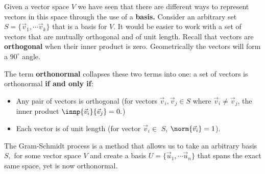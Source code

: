 \pgfplotsset{width=7cm,compat=1.16}


Given a vector space $V$ we have seen that there are different ways to represent vectors in this space through the use of a \textbf{basis.} Consider an arbitrary set $S = \{ \vec{v}_{1}, \cdots \vec{v}_{k} \}$ that is a basis for $V.$ It would be easier to work with a set of vectors that are mutually orthogonal and of unit length. Recall that vectors are \textbf{orthogonal} when their inner product is zero. Geometrically the vectors will form a $90^{\circ}$ angle.

The term \textbf{orthonormal} collapses these two terms into one: a set of vectors is orthonormal \textbf{if and only if}:
  \begin{itemize}
    \item Any pair of vectors is orthogonal (for vectors $\vec{v}_{i}, \vec{v}_{j} \in S$ where $\vec{v}_{i} \neq \vec{v}_{j}$, the inner product $\innp{\vec{v}_{i}}{\vec{v}_{j}} = 0.$)
    \item Each vector is of unit length (for vector $\vec{v}_{i} \in $ $S$, $\norm{\vec{v}_{i}} = 1$).
  \end{itemize}

The Gram-Schmidt process is a method that allows us to take an arbitrary basis $S,$ for some vector space $V$ and create a basis $U = \{ \vec{u}_{1}, \cdots \vec{u}_{n} \}$ that spans the exact same space, yet is now orthonormal.

